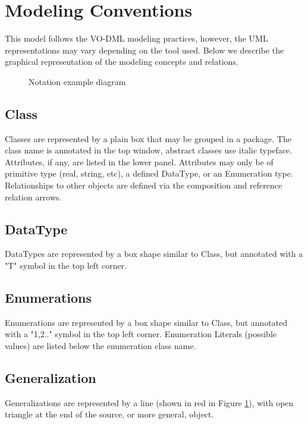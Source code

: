 \pagebreak
\section{Modeling Conventions}
This model follows the VO-DML modeling practices, however, the UML representations may vary depending on the tool used.  Below we describe the graphical representation of the modeling concepts and relations.

  \begin{figure}[h]
  \begin{center}
    \caption{Notation example diagram}\label{fig:notation_example}
  \end{center}
  \end{figure}

  \subsection{Class}
  \label{sect:Class}
  Classes are represented by a plain box that may be grouped in a package. The class name is annotated in the top window, abstract
classes use italic typeface. Attributes, if any, are listed in the lower panel. Attributes may only be
of primitive type (real, string, etc), a defined DataType, or an Enumeration type. Relationships to
other objects are defined via the composition and reference relation arrows.

  \subsection{DataType}
  \label{sect:DataType}
  DataTypes are represented by a box shape similar to Class, but annotated with a "T" symbol in the top left corner.

  \subsection{Enumerations}
  \label{sect:Enumerations}
  Enumerations are represented by a box shape similar to Class, but annotated with a "1,2.."
symbol in the top left corner. Enumeration Literals (possible values) are listed below the
enumeration class name.

  \subsection{Generalization}
  \label{sect:Generalization}
  Generalizations are represented by a line (shown in red in Figure \ref{fig:notation_example}), with open triangle at the end of the source, or more general, object.

